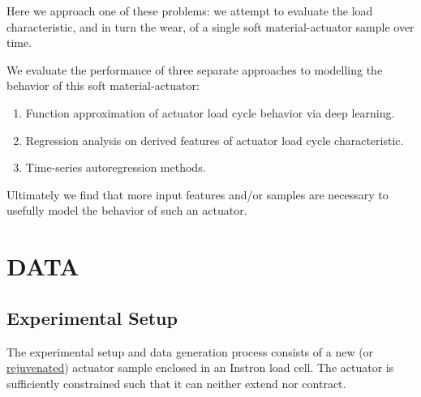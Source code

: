 \documentclass[letterpaper, 10 pt, conference]{ieeeconf}  %
\begin{document}
Here we approach one of these problems: we attempt to evaluate the load characteristic, and in turn the wear, of a single soft material-actuator sample over time.

We evaluate the performance of three separate approaches to modelling the behavior of this soft material-actuator:
\begin{enumerate}
	\item Function approximation of actuator load cycle behavior via deep learning.
    \item Regression analysis on derived features of actuator load cycle characteristic.
    \item Time-series autoregression methods.
\end{enumerate}

Ultimately we find that more input features and/or samples are necessary to usefully model the behavior of such an actuator.


\section{DATA}

\subsection{Experimental Setup}
The experimental setup and data generation process consists of a new (or \href{https://www.cambridge.org/core/journals/mrs-communications/article/rejuvenation-of-soft-materialactuator/0D5EA2D555F28C616AB00B773DDFF313}{rejuvenated}) actuator sample enclosed in an Instron load cell. The actuator is sufficiently constrained such that it can neither extend nor contract.
\end{document}
